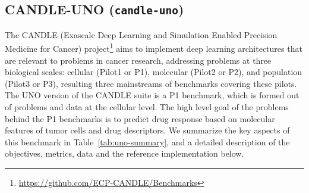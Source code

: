 \subsection{CANDLE-UNO ({\tt candle-uno})} %

The CANDLE (Exascale Deep Learning and Simulation Enabled Precision Medicine for Cancer) project\footnote{\url{https://github.com/ECP-CANDLE/Benchmarks}} aims to implement deep learning architectures that are relevant to problems in cancer research, addressing problems at three biological scales: cellular (Pilot1 or P1), molecular (Pilot2 or P2), and population (Pilot3 or P3), resulting three mainstreams of benchmarks covering these pilots. The UNO version of the CANDLE suite is a P1 benchmark, which is formed out of problems and data at the cellular level. The high level goal of the problems behind the P1 benchmarks is to predict drug response based on molecular features of tumor cells and drug descriptors. We summarize the key aspects of this benchmark in Table~\ref{tab:uno-summary}, and a detailed description of the objectives, metrics, data and the reference implementation below.


